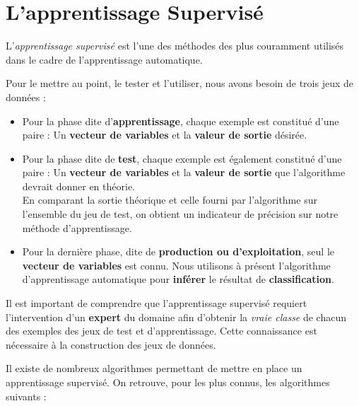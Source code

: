 \section{L'apprentissage Supervisé}

L'\textit{apprentissage supervisé} est l'une des méthodes des plus couramment utilisés dans le cadre de l'apprentissage automatique.

Pour le mettre au point, le tester et l'utiliser, nous avons besoin de trois jeux de données :

\begin{itemize}
	\item Pour la phase dite d'\textbf{apprentissage}, chaque exemple est constitué d'une paire : Un \textbf{vecteur de variables} et la \textbf{valeur de sortie} désirée.\\
	
	\item Pour la phase dite de \textbf{test}, chaque exemple est également constitué d'une paire : Un \textbf{vecteur de variables} et la \textbf{valeur de sortie} que l'algorithme devrait donner en théorie.\\ 
	En comparant la sortie théorique et celle fourni par l'algorithme sur l'ensemble du jeu de test, on obtient un indicateur de précision sur notre méthode d'apprentissage.\\
	
	\item Pour la dernière phase, dite de \textbf{production ou d'exploitation}, seul le \textbf{vecteur de variables} est connu. Nous utilisons à présent l'algorithme d'apprentissage automatique pour \textbf{inférer} le résultat de \textbf{classification}.

\end{itemize}
\vspace{3mm}

Il est important de comprendre que l'apprentissage supervisé requiert l'intervention d'un \textbf{expert} du domaine afin d'obtenir la \textit{vraie classe} de chacun des exemples des jeux de test et d'apprentissage. Cette connaissance est nécessaire à la construction des jeux de données.

\vspace{3mm}

Il existe de nombreux algorithmes permettant de mettre en place un apprentissage supervisé. On retrouve, pour les plus connus, les algorithmes suivants : 

